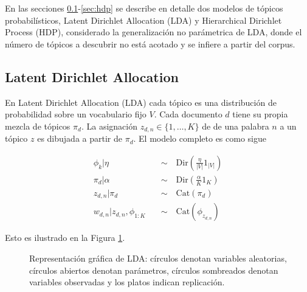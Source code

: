 \documentclass[letterpaper,12pt,oneside]{book} %
\begin{document}
En las secciones \ref{sec:lda}-\ref{sec:hdp} se describe en detalle dos modelos de tópicos probabilísticos, Latent Dirichlet Allocation (LDA) y Hierarchical Dirichlet Process (HDP), considerado la generalización no parámetrica de LDA, donde el número de tópicos a descubrir no está acotado y se infiere a partir del corpus.\\

\subsection{Latent Dirichlet Allocation}
\label{sec:lda}

En Latent Dirichlet Allocation (LDA) \citep{blei2003latent} cada tópico es una distribución de probabilidad sobre un vocabulario fijo $V$. Cada documento $d$ tiene su propia mezcla de tópicos $\pi_{d}$. La asignación $z_{d,n}\in\{1, \ldots, K\}$  de de una palabra $n$ a un tópico $z$ es dibujada a partir de $\pi_{d}$. El modelo completo es como sigue

\begin{align}
    \phi_{k}|\eta \quad & \sim\quad \text{Dir}(\frac{\eta}{|V|}1_{|V|})\\
    \pi_{d}|\alpha \quad & \sim \quad \text{Dir}(\frac{\alpha}{K}1_{K})\\
    z_{d,n}|\pi_{d} \quad & \sim \quad \text{Cat}(\pi_{d})\\
    w_{d,n}|z_{d,n}, \phi_{1:K} \quad & \sim \quad \text{Cat}(\phi_{z_{d,n}})
\end{align}

Esto es ilustrado en la Figura \ref{img:lda}.
\begin{figure}
  \centering
\caption{Representación gráfica de LDA: círculos denotan variables aleatorias, círculos abiertos denotan parámetros, círculos sombreados denotan variables observadas y los platos indican replicación.}
\label{img:lda}
\end{figure}
\end{document}
